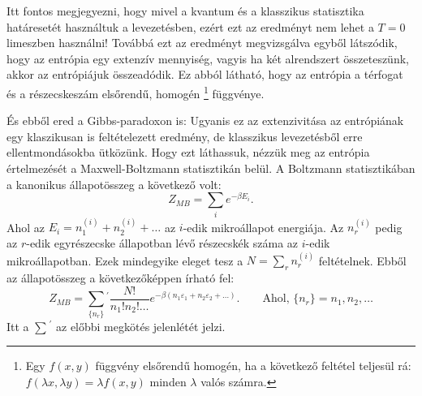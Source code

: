 \documentclass[../main.tex]{subfiles}
\begin{document}
Itt fontos megjegyezni, hogy mivel a kvantum és a klasszikus statisztika határesetét használtuk a levezetésben, ezért ezt az eredményt nem lehet a $T = 0$ limeszben használni! Továbbá ezt az eredményt megvizsgálva
egyből látszódik, hogy az entrópia egy extenzív mennyiség, vagyis ha két alrendszert összeteszünk, akkor az entrópiájuk összeadódik. Ez abból látható, hogy az entrópia a térfogat és a részecskeszám
elsőrendű, homogén
\footnote{
    Egy $f(x,y)$ függvény elsőrendű homogén, ha a következő feltétel teljesül rá: $f(\lambda x, \lambda y) = \lambda f(x,y)$ minden $\lambda$ valós számra.
} 
függvénye.

És ebből ered a Gibbs-paradoxon is: Ugyanis ez az extenzivitása az entrópiának egy klaszikusan is feltételezett eredmény, de klasszikus levezetésből erre ellentmondásokba ütközünk. Hogy ezt láthassuk,
nézzük meg az entrópia értelmezését a Maxwell-Boltzmann statisztikán belül. A Boltzmann statisztikában a kanonikus állapotösszeg a következő volt:
\begin{equation}
    Z_{MB} = \sum_i e^{-\beta E_i}.
\end{equation}
Ahol az $E_i = n^{(i)}_1 + n^{(i)}_2 + \dots$ az $i$-edik mikroállapot energiája. Az $n^{(i)}_r$ pedig az $r$-edik egyrészecske állapotban lévő részecskék száma az $i$-edik mikroállapotban. Ezek mindegyike
eleget tesz a $N = \sum_r n^{(i)}_r$ feltételnek. Ebből az állapotösszeg a következőképpen írható fel:
\begin{equation}
    Z_{MB} = \sum_{\{n_r\}}^{}{}^{'} \frac{N!}{n_1! n_2! \ldots} e^{-\beta (n_1 \varepsilon_1 + n_2 \varepsilon_2 + \ldots)}. \qquad \text{Ahol, } \{n_r\} = n_1, n_2, \ldots
\end{equation}
Itt a $\sum^{}{}^{'}$ az előbbi megkötés jelenlétét jelzi.
\end{document}
